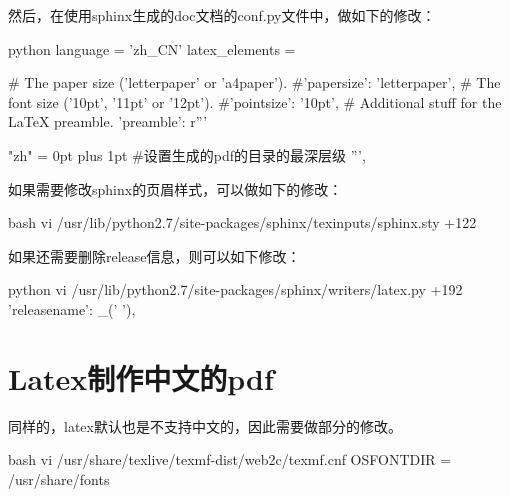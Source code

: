 然后，在使用sphinx生成的doc文档的conf.py文件中，做如下的修改：
\begin{code-block}{python}
language = 'zh_CN'
latex_elements = {
# The paper size ('letterpaper' or 'a4paper').
#'papersize': 'letterpaper',
# The font size ('10pt', '11pt' or '12pt').
#'pointsize': '10pt',
# Additional stuff for the LaTeX preamble.
'preamble': r'''
     \usepackage{xeCJK}
     \XeTeXlinebreaklocale "zh"
     \XeTeXlinebreakskip = 0pt plus 1pt
     \setcounter{tocdepth}{4}  #设置生成的pdf的目录的最深层级
''',
}
\end{code-block}

如果需要修改sphinx的页眉样式，可以做如下的修改：
\begin{code-block}{bash}
vi /usr/lib/python2.7/site-packages/sphinx/texinputs/sphinx.sty +122
\fancyhead[LE,RO]{{\py@HeaderFamily \@title}}
\end{code-block}

如果还需要删除release信息，则可以如下修改：
\begin{code-block}{python}
vi /usr/lib/python2.7/site-packages/sphinx/writers/latex.py +192
'releasename':  _(' '),
\end{code-block}

\section{Latex制作中文的pdf}
同样的，latex默认也是不支持中文的，因此需要做部分的修改。
\begin{code-block}{bash}
vi /usr/share/texlive/texmf-dist/web2c/texmf.cnf
OSFONTDIR = /usr/share/fonts
\end{code-block}

